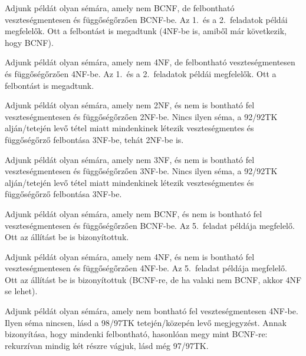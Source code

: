 \documentclass[a5paper]{article}
\begin{document}
Adjunk példát olyan sémára, amely nem BCNF, de felbontható veszteségmentesen
és függőségőrzően BCNF-be.
\megoldas Az 1.\ és a 2.\ feladatok példái megfelelők. Ott a felbontást is
megadtunk (4NF-be is, amiből már következik, hogy BCNF).

Adjunk példát olyan sémára, amely nem 4NF, de felbontható veszteségmentesen
és függőségőrzően 4NF-be.
\megoldas Az 1.\ és a 2.\ feladatok példái megfelelők. Ott a felbontást is
megadtunk.


Adjunk példát olyan sémára, amely nem 2NF, és nem is bontható fel
veszteségmentesen és függőségőrzően 2NF-be.
\megoldas Nincs ilyen séma, a 92/92TK alján/tetején levő tétel miatt mindenkinek
létezik veszteségmentes és függőségőrző felbontása 3NF-be, tehát 2NF-be is.

Adjunk példát olyan sémára, amely nem 3NF, és nem is bontható fel
veszteségmentesen és függőségőrzően 3NF-be.
\megoldas Nincs ilyen séma, a 92/92TK alján/tetején levő tétel miatt mindenkinek
létezik veszteségmentes és függőségőrző felbontása 3NF-be.

Adjunk példát olyan sémára, amely nem BCNF, és nem is bontható fel
veszteségmentesen és függőségőrzően BCNF-be.
\megoldas Az 5.\ feladat példája megfelelő. Ott az állítást be is
bizonyítottuk.

Adjunk példát olyan sémára, amely nem 4NF, és nem is bontható fel
veszteségmentesen és függőségőrzően 4NF-be.
\megoldas Az 5.\ feladat példája megfelelő. Ott az állítást be is
bizonyítottuk (BCNF-re, de ha valaki nem BCNF, akkor 4NF se lehet).

Adjunk példát olyan sémára, amely nem bontható fel veszteségmentesen 4NF-be.
\megoldas Ilyen séma nincsen, lásd a 98/97TK tetején/közepén levő megjegyzést. Annak
bizonyítása, hogy mindenki felbontható, hasonlóan megy mint BCNF-re:
rekurzívan mindig két részre vágjuk, lásd még 97/97TK.

\end{document}
